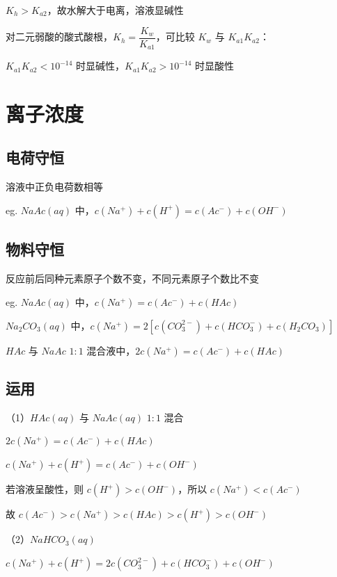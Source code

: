 \documentclass[UTF8,zihao=-4,openany]{ctexbook}
\begin{document}
$K_h>K_{a2}$，故水解大于电离，溶液显碱性\par

对二元弱酸的酸式酸根，$K_h=\dfrac{K_w}{K_{a1}}$，可比较 $K_w$ 与 $K_{a1}K_{a2}$：\par

$K_{a1}K_{a2}<10^{-14}$ 时显碱性，$K_{a1}K_{a2}>10^{-14}$ 时显酸性\par
\section{离子浓度}
\subsection{电荷守恒}
溶液中正负电荷数相等\par

eg. $NaAc(aq)$ 中，$c(Na^+)+c(H^+)=c(Ac^-)+c(OH^-)$\par
\subsection{物料守恒}
反应前后同种元素原子个数不变，不同元素原子个数比不变\par

eg. $NaAc(aq)$ 中，$c(Na^+)=c(Ac^-)+c(HAc)$\par

$Na_2CO_3(aq)$ 中，$c(Na^+)=2[c(CO_3^{2-})+c(HCO_3^-)+c(H_2CO_3)]$\par

$HAc$ 与 $NaAc$ $1:1$ 混合液中，$2c(Na^+)=c(Ac^-)+c(HAc)$\par
\subsection{运用}
（1）$HAc(aq)$ 与 $NaAc(aq)$ $1:1$ 混合\par

$2c(Na^+)=c(Ac^-)+c(HAc)$\par

$c(Na^+)+c(H^+)=c(Ac^-)+c(OH^-)$\par

若溶液呈酸性，则 $c(H^+)>c(OH^-)$，所以 $c(Na^+)<c(Ac^-)$\par

故 $c(Ac^-)>c(Na^+)>c(HAc)>c(H^+)>c(OH^-)$\par

\medskip
（2）$NaHCO_3(aq)$\par

$c(Na^+)+c(H^+)=2c(CO_3^{2-})+c(HCO_3^-)+c(OH^-)$\par
\end{document}
